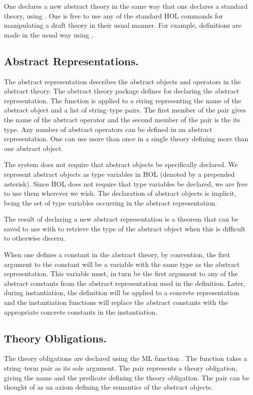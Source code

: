 One declares a new abstract theory in the same way that one declares a
standard theory, using .  One is free to use any of the
standard HOL commands for manipulating a draft theory in their usual
manner.  For example, definitions are made in the usual way using
.

\subsection{Abstract Representations.}
The abstract representation describes the abstract objects and operators in
the abstract theory. The abstract theory package defines
 for declaring the abstract representation.
The function is applied to a string representing the name of the abstract
object and a list of string--type pairs.  The first member of the pair
gives the name of the abstract operator and the second member of the pair
is the its type. Any number of abstract operators can be defined in an
abstract representation.  One can use 
more than once in a single theory defining more than one abstract object.

The system does not require that abstract objects be specifically declared.
We represent abstract objects as type variables in HOL (denoted by a
prepended asterisk).  Since HOL does not require that type variables be
declared, we are free to use them wherever we wish.  The declaration of
abstract objects is implicit, being the set of type variables
occurring in the abstract representation.  

The result of declaring a new abstract representation is a theorem that can
be saved to use with  to retrieve the type of the
abstract object when this is difficult to otherwise discern. 

When one defines a constant in the abstract theory, by convention, the
first argument to the constant will be a variable with the same type as the
abstract representation.  This variable must, in turn be the first argument
to any of the abstract constants from the abstract representation used in
the definition.  Later, during instantiation, the definition will be
applied to a concrete representation and the instantiation functions will
replace the abstract constants with the appropriate concrete constants in
the instantiation.

\subsection{Theory Obligations.}
The theory obligations are declared using the ML function
. The function takes a string--term
pair as its sole argument.  The pair represents a theory obligation, giving
the name and the predicate defining the theory obligation.  The pair can be
thought of as an axiom defining the semantics of the abstract objects.  

